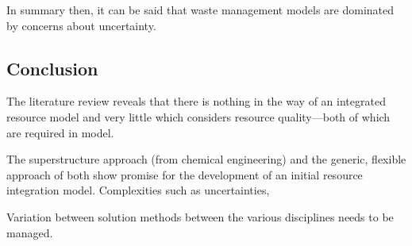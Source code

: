 In summary then, it can be said that waste management models are dominated by concerns about uncertainty.

\subsection{Conclusion}
The literature review reveals that there is nothing in the way of an integrated resource model and very little which considers resource quality---both of which are required in model.

The superstructure approach (from chemical engineering) and the generic, flexible approach of \citet{Samsatli} both show promise for the development of an initial resource integration model. Complexities such as uncertainties, 

Variation between solution methods between the various disciplines needs to be managed.

